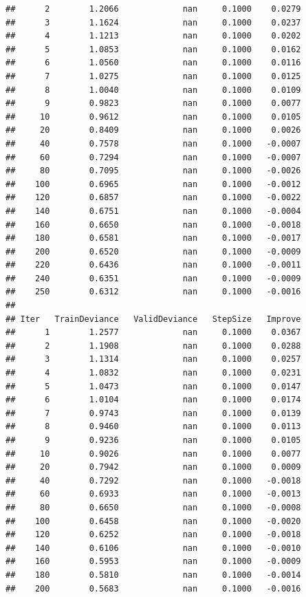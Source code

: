 \documentclass[]{book}
\begin{document}
\begin{verbatim}
##      2        1.2066             nan     0.1000    0.0279
##      3        1.1624             nan     0.1000    0.0237
##      4        1.1213             nan     0.1000    0.0202
##      5        1.0853             nan     0.1000    0.0162
##      6        1.0560             nan     0.1000    0.0116
##      7        1.0275             nan     0.1000    0.0125
##      8        1.0040             nan     0.1000    0.0109
##      9        0.9823             nan     0.1000    0.0077
##     10        0.9612             nan     0.1000    0.0105
##     20        0.8409             nan     0.1000    0.0026
##     40        0.7578             nan     0.1000   -0.0007
##     60        0.7294             nan     0.1000   -0.0007
##     80        0.7095             nan     0.1000   -0.0026
##    100        0.6965             nan     0.1000   -0.0012
##    120        0.6857             nan     0.1000   -0.0022
##    140        0.6751             nan     0.1000   -0.0004
##    160        0.6650             nan     0.1000   -0.0018
##    180        0.6581             nan     0.1000   -0.0017
##    200        0.6520             nan     0.1000   -0.0009
##    220        0.6436             nan     0.1000   -0.0011
##    240        0.6351             nan     0.1000   -0.0009
##    250        0.6312             nan     0.1000   -0.0016
## 
## Iter   TrainDeviance   ValidDeviance   StepSize   Improve
##      1        1.2577             nan     0.1000    0.0367
##      2        1.1908             nan     0.1000    0.0288
##      3        1.1314             nan     0.1000    0.0257
##      4        1.0832             nan     0.1000    0.0231
##      5        1.0473             nan     0.1000    0.0147
##      6        1.0104             nan     0.1000    0.0174
##      7        0.9743             nan     0.1000    0.0139
##      8        0.9460             nan     0.1000    0.0113
##      9        0.9236             nan     0.1000    0.0105
##     10        0.9026             nan     0.1000    0.0077
##     20        0.7942             nan     0.1000    0.0009
##     40        0.7292             nan     0.1000   -0.0018
##     60        0.6933             nan     0.1000   -0.0013
##     80        0.6650             nan     0.1000   -0.0008
##    100        0.6458             nan     0.1000   -0.0020
##    120        0.6252             nan     0.1000   -0.0018
##    140        0.6106             nan     0.1000   -0.0010
##    160        0.5953             nan     0.1000   -0.0009
##    180        0.5810             nan     0.1000   -0.0014
##    200        0.5683             nan     0.1000   -0.0016

\end{verbatim}
\end{document}
